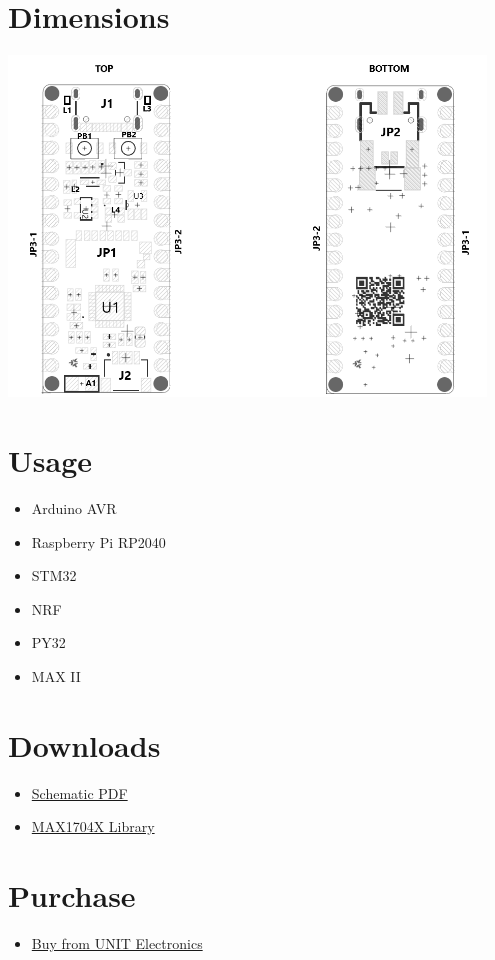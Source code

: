 \documentclass[10pt]{article}
\begin{document}
\section*{Dimensions}
\vspace{1em}
\begin{center}
\includegraphics[width=0.95\textwidth,keepaspectratio]{images/dimensions.png}
\end{center}



\section*{Usage}
\begin{itemize}
\item Arduino AVR
\item Raspberry Pi RP2040
\item STM32
\item NRF
\item PY32
\item MAX II
\end{itemize}

\section*{Downloads}
\begin{itemize}
\begin{itemize}
\item \href{docs/schematic.pdf}{Schematic PDF}
\item \href{https://github.com/UNIT-Electronics/MAX1704X_lib}{MAX1704X Library}
\end{itemize}
\end{itemize}

\section*{Purchase}
\begin{itemize}
\item \href{https://www.uelectronics.com}{Buy from UNIT Electronics}
\end{itemize}
\end{document}
